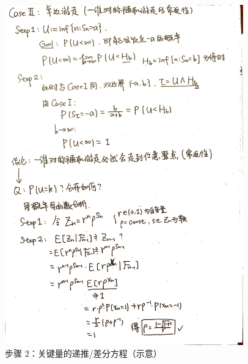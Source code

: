 \documentclass[12pt, a4paper, oneside, fontset=windows]{ctexbook}
\begin{document}
\begin{figure}[h]
	\centering
	\includegraphics[width=0.92\textwidth]{2.jpg}
	\caption{步骤 2：关键量的递推/差分方程（示意）}\label{fig:rw-step2}
\end{figure}
\end{document}
